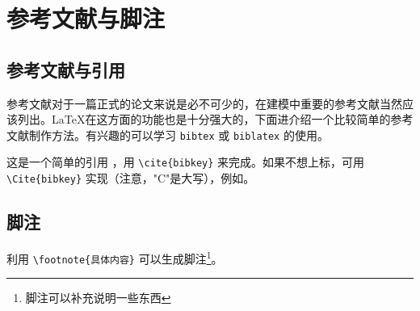 

\chapter{参考文献与脚注}

\section{参考文献与引用}

参考文献对于一篇正式的论文来说是必不可少的，在建模中重要的参考文献当然应该列出。\LaTeX{}在这方面的功能也是十分强大的，下面进介绍一个比较简单的参考文献制作方法。有兴趣的可以学习 \verb|bibtex| 或 \verb|biblatex| 的使用。

这是一个简单的引用 \cite{zhangkun1994,zhukezhen1973}，用 \verb|\cite{bibkey}| 来完成。如果不想上标，可用 \verb|\Cite{bibkey}| 实现（注意，"C"是大写），例如\Cite{scitor2000project}。


\section{脚注}

利用 \verb|\footnote{具体内容}| 可以生成脚注\footnote{脚注可以补充说明一些东西}。
